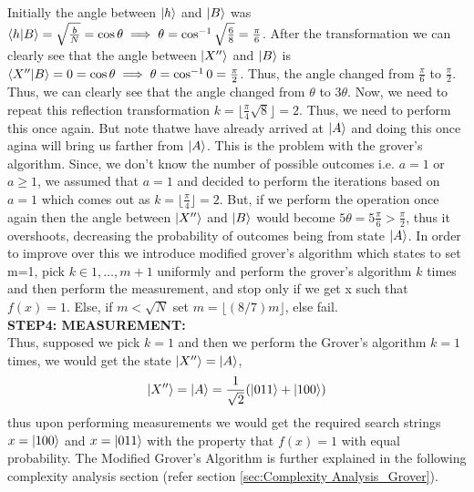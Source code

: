 Initially the angle between $\ket{h}$ and $\ket{B}$ was $\braket{h|B}=\sqrt{\frac{b}{N}}=\cos \theta \implies \theta = \cos^{-1} \sqrt{\frac{6}{8}}=\frac{\pi}{6}$. After the transformation we can clearly see that the angle between $\ket{X''}$ and $\ket{B}$ is $\braket{X''|B}=0=\cos \theta \implies \theta = \cos^{-1} 0 = \frac{\pi}{2}$. Thus, the angle changed from $\frac{\pi}{6}$ to $\frac{\pi}{2}$. Thus, we can clearly see that the angle changed from $\theta$ to $3\theta$. Now, we need to repeat this reflection transformation $k=\lfloor \frac{\pi}{4}\sqrt{8}\rfloor = 2$. Thus, we need to perform this once again. But note thatwe have already arrived at $\ket{A}$ and doing this once agina will bring us farther from $\ket{A}$. This is the problem with the grover's algorithm. Since, we don't know the number of possible outcomes i.e. $a=1$ or $a \geq 1$, we assumed that $a=1$ and decided to perform the iterations based on $a=1$ which comes out as $k=\lfloor \frac{\pi}{4}\rfloor=2$. But, if we perform the operation once again then the angle between $\ket{X''}$ and $\ket{B}$ would become $5\theta=5\frac{\pi}{6} > \frac{\pi}{2}$, thus it overshoots, decreasing the probability of outcomes being from state $\ket{A}$. In order to improve over this we introduce modified grover's algorithm which states to set m=1, pick $k\in1,\ldots, m+1$ uniformly  and perform the grover's algorithm $k$ times and then perform the measurement, and stop only if we get x such that $f(x)=1$. Else, if $m<\sqrt{N}$ set $m=\lfloor (8/7)m\rfloor$, else fail.\\
\textbf{STEP4: MEASUREMENT: }\\
Thus, supposed we pick $k=1$ and then we perform the Grover's algorithm $k=1$ times, we would get the state $\ket{X''}=\ket{A}$,
\[
\ket{X''}=\ket{A}=\frac{1}{\sqrt{2}}(\ket{011}+\ket{100})
\]
thus upon performing measurements we would get the required search strings $x=\ket{100}$ and $x=\ket{011}$ with the property that $f(x)=1$ with equal probability. The Modified Grover's Algorithm is further explained in the following complexity analysis section (refer section \ref{sec:Complexity Analysis_Grover}).

